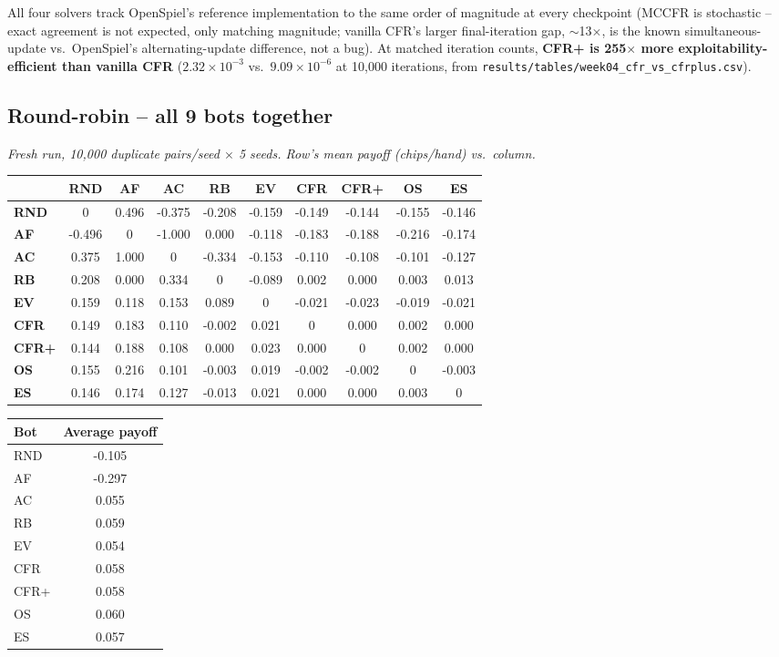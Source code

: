 \documentclass[11pt]{article}
\newcommand{\code}[1]{\texttt{#1}}
\newcommand{\highlight}[1]{\textbf{#1}}
\begin{document}
All four solvers track OpenSpiel's reference implementation to the same order of
magnitude at every checkpoint (MCCFR is stochastic -- exact agreement is not expected,
only matching magnitude; vanilla CFR's larger final-iteration gap, $\sim$13$\times$, is
the known simultaneous-update vs.\ OpenSpiel's alternating-update difference, not a
bug). At matched iteration counts, \highlight{CFR+ is 255$\times$ more
exploitability-efficient than vanilla CFR} ($2.32\times10^{-3}$ vs.\
$9.09\times10^{-6}$ at 10{,}000 iterations, from
\code{results/tables/week04\_cfr\_vs\_cfrplus.csv}).

\subsection*{Round-robin -- all 9 bots together}
\emph{Fresh run, 10{,}000 duplicate pairs/seed $\times$ 5 seeds. Row's mean payoff
(chips/hand) vs.\ column.}

\begin{center}
\small
\begin{tabular}{lccccccccc}
\toprule
 & RND & AF & AC & RB & EV & CFR & CFR+ & OS & ES \\
\midrule
\textbf{RND} & 0 & 0.496 & -0.375 & -0.208 & -0.159 & -0.149 & -0.144 & -0.155 & -0.146 \\
\textbf{AF} & -0.496 & 0 & -1.000 & 0.000 & -0.118 & -0.183 & -0.188 & -0.216 & -0.174 \\
\textbf{AC} & 0.375 & 1.000 & 0 & -0.334 & -0.153 & -0.110 & -0.108 & -0.101 & -0.127 \\
\textbf{RB} & 0.208 & 0.000 & 0.334 & 0 & -0.089 & 0.002 & 0.000 & 0.003 & 0.013 \\
\textbf{EV} & 0.159 & 0.118 & 0.153 & 0.089 & 0 & -0.021 & -0.023 & -0.019 & -0.021 \\
\textbf{CFR} & 0.149 & 0.183 & 0.110 & -0.002 & 0.021 & 0 & 0.000 & 0.002 & 0.000 \\
\textbf{CFR+} & 0.144 & 0.188 & 0.108 & 0.000 & 0.023 & 0.000 & 0 & 0.002 & 0.000 \\
\textbf{OS} & 0.155 & 0.216 & 0.101 & -0.003 & 0.019 & -0.002 & -0.002 & 0 & -0.003 \\
\textbf{ES} & 0.146 & 0.174 & 0.127 & -0.013 & 0.021 & 0.000 & 0.000 & 0.003 & 0 \\
\bottomrule
\end{tabular}
\end{center}

\begin{center}
\begin{tabular}{lc}
\toprule
Bot & Average payoff \\
\midrule
RND & -0.105 \\
AF & -0.297 \\
AC & 0.055 \\
RB & 0.059 \\
EV & 0.054 \\
CFR & 0.058 \\
CFR+ & 0.058 \\
OS & 0.060 \\
ES & 0.057 \\
\bottomrule
\end{tabular}
\end{center}
\end{document}
